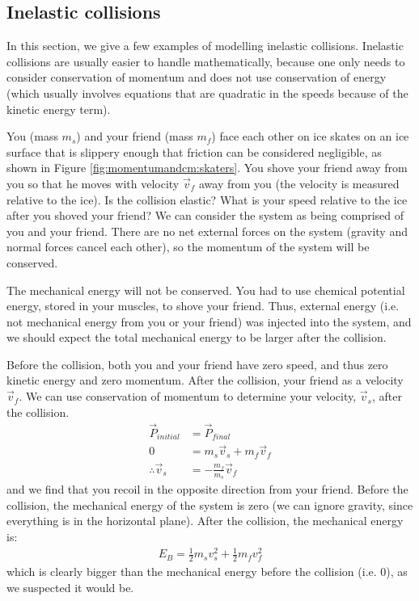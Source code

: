 \subsection{Inelastic collisions}
In this section, we give a few examples of modelling inelastic collisions. Inelastic collisions are usually easier to handle mathematically, because one only needs to consider conservation of momentum and does not use conservation of energy (which usually involves equations that are quadratic in the speeds because of the kinetic energy term). 
\begin{example}{
You (mass $m_s$) and your friend (mass $m_f$) face each other on ice skates on an ice surface that is slippery enough that friction can be considered negligible, as shown in Figure \ref{fig:momentumandcm:skaters}. You shove your friend away from you so that he moves with velocity $\vec v_f$ away from you (the velocity is measured relative to the ice). Is the collision elastic? What is your speed relative to the ice after you shoved your friend?}
We can consider the system as being comprised of you and your friend. There are no net external forces on the system (gravity and normal forces cancel each other), so the momentum of the system will be conserved. 

The mechanical energy will not be conserved. You had to use chemical potential energy, stored in your muscles, to shove your friend. Thus, external energy (i.e. not mechanical energy from you or your friend) was injected into the system, and we should expect the total mechanical energy to be larger after the collision. 

Before the collision, both you and your friend have zero speed, and thus zero kinetic energy and zero momentum. After the collision, your friend as a velocity $\vec v_f$. We can use conservation of momentum to determine your velocity, $\vec v_s$, after the collision. 
\begin{align*}
\vec P_{initial} &=\vec P_{final}\\
0 &= m_s\vec v_s + m_f\vec v_f\\
\therefore \vec v_s &= -\frac{m_f}{m_s}\vec v_f
\end{align*}
and we find that you recoil in the opposite direction from your friend. Before the collision, the mechanical energy of the system is zero (we can ignore gravity, since everything is in the horizontal plane). After the collision, the mechanical energy is:
\begin{align*}
E_B = \frac{1}{2}m_sv_s^2+\frac{1}{2}m_fv_f^2
\end{align*}
which is clearly bigger than the mechanical energy before the collision (i.e. 0), as we suspected it would be.


\end{example}
